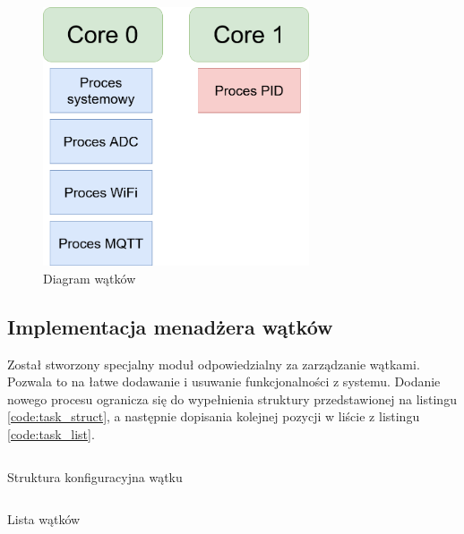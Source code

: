             \begin{figure}[ht]
                \centering
                \includegraphics[width=0.7\textwidth]{img/task_diagram.png}
                \caption{Diagram wątków}
                \label{fig:task_diagram}
            \end{figure}
            
            \subsection{Implementacja menadżera wątków}
            Został stworzony specjalny moduł odpowiedzialny za zarządzanie wątkami. Pozwala to na łatwe dodawanie i usuwanie funkcjonalności z systemu. Dodanie nowego procesu ogranicza się do wypełnienia struktury przedstawionej na listingu \ref{code:task_struct}, a następnie dopisania kolejnej pozycji w liście z listingu \ref{code:task_list}.
            
            \begin{kod}
              \inputminted[firstline=12, lastline=22]{cpp}{esp/listings/task_mngm.hpp}
              \caption{Struktura konfiguracyjna wątku}
              \label{code:task_struct}
              \vspace{2em}
            \end{kod}
            
            \begin{kod}
              \inputminted[firstline=25, lastline=32]{cpp}{esp/listings/task_mngm.hpp}
              \caption{Lista wątków}
              \label{code:task_list}
              \vspace{2em}
            \end{kod}
            
